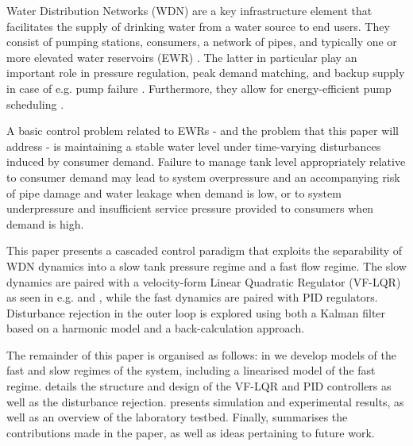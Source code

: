 
Water Distribution Networks (WDN) are a key infrastructure element that facilitates the supply of drinking water from a water source to end users. They consist of pumping stations, consumers, a network of pipes, and typically one or more elevated water reservoirs (EWR) \cite{Swamee2008}. The latter in particular play an important role in pressure regulation, peak demand matching, and backup supply in case of e.g. pump failure \cite{Val2020,Creaco2019}. Furthermore, they allow for energy-efficient pump scheduling \cite{Rathore1030,Bello2019}.  

A basic control problem related to EWRs - and the problem that this paper will address - is maintaining a stable water level under time-varying disturbances induced by consumer demand. Failure to manage tank level appropriately relative to consumer demand may lead to system overpressure and an accompanying risk of pipe damage and water leakage when demand is low, or to system underpressure and insufficient service pressure provided to consumers when demand is high.  

This paper presents a cascaded control paradigm that exploits the separability of WDN dynamics into a slow tank pressure regime and a fast flow regime. The slow dynamics are paired with a velocity-form Linear Quadratic Regulator (VF-LQR) as seen in e.g. \cite{Pannocchia2001,Pannocchia2015a} and \cite{Ruscio2012}, while the fast dynamics are paired with PID regulators. Disturbance rejection in the outer loop is explored using both a Kalman filter based on a harmonic model and a back-calculation approach.

The remainder of this paper is organised as follows: in  we develop models of the fast and slow regimes of the system, including a linearised model of the fast regime.  details the structure and design of the VF-LQR and PID controllers as well as the disturbance rejection.  presents simulation and experimental results, as well as an overview of the laboratory testbed. Finally,  summarises the contributions made in the paper, as well as ideas pertaining to future work.